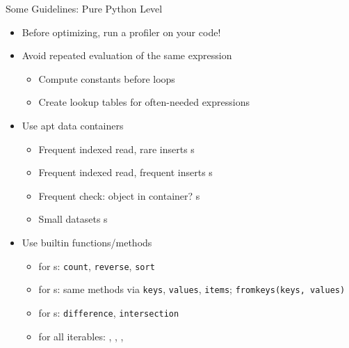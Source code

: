 \begin{frame}{Some Guidelines: Pure Python Level}
%
\begin{itemize}
\item Before optimizing, run a profiler on your code!
\item Avoid repeated evaluation of the same expression
	\begin{itemize}
	\item Compute constants before loops
	\item Create lookup tables for often-needed expressions
	\end{itemize}
\item Use apt data containers
	\begin{itemize}
	\item Frequent indexed read, rare inserts \Thus {}s
	\item Frequent indexed read, frequent inserts \Thus {}s
	\item Frequent check: object in container? \Thus {}s
	\item Small datasets \Thus {}s
	\end{itemize}
\item Use builtin functions/methods
	\begin{itemize}
	\item for s: \texttt{count}, \texttt{reverse}, \texttt{sort}
	\item for s: same methods via \texttt{keys}, \texttt{values}, \texttt{items}; \texttt{fromkeys(keys, values)}
	\item for s: \texttt{difference}, \texttt{intersection}
	\item for all iterables: , , , 
	\end{itemize}
\end{itemize}
%
\end{frame}


